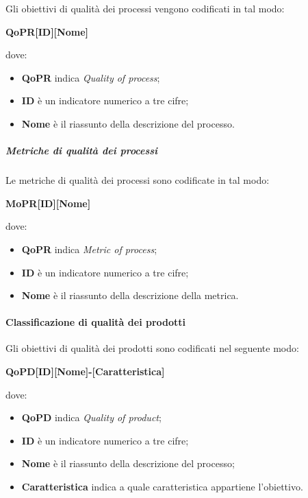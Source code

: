 \documentclass[../norme-di-progetto.tex]{subfiles}
\begin{document}
Gli obiettivi di qualità dei processi vengono codificati in tal modo: \\
\begin{center}
  \centering
  \textbf{QoPR[ID][Nome]}
\end{center} dove:
\begin{itemize}
  \item \textbf{QoPR} indica \textit{Quality of process};
  \item \textbf{ID} è un indicatore numerico a tre cifre;
  \item \textbf{Nome} è il riassunto della descrizione del processo.
\end{itemize}

\subparagraph{Metriche di qualità dei processi}
Le metriche di qualità dei processi sono codificate in tal modo: \\
\begin{center}
  \centering
  \textbf{MoPR[ID][Nome]}
\end{center} dove:
\begin{itemize}
  \item \textbf{QoPR} indica \textit{Metric of process};
  \item \textbf{ID} è un indicatore numerico a tre cifre;
  \item \textbf{Nome} è il riassunto della descrizione della metrica.
\end{itemize}

\paragraph{Classificazione di qualità dei prodotti}
Gli obiettivi di qualità dei prodotti sono codificati nel seguente modo: \\
\begin{center}
  \centering
  \textbf{QoPD[ID][Nome]-[Caratteristica]}
\end{center} dove:
\begin{itemize}
  \item \textbf{QoPD} indica \textit{Quality of product};
  \item \textbf{ID} è un indicatore numerico a tre cifre;
  \item \textbf{Nome} è il riassunto della descrizione del processo;
  \item \textbf{Caratteristica} indica a quale caratteristica appartiene l'obiettivo.
\end{itemize}
\end{document}
